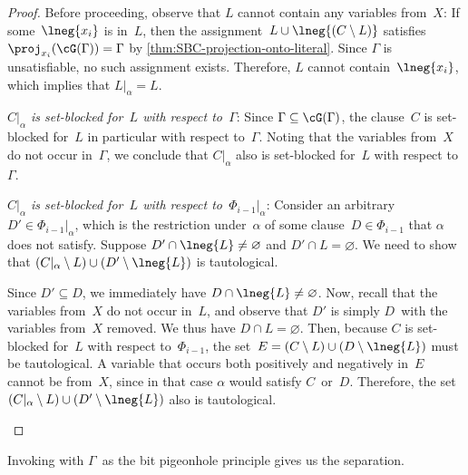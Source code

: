 \documentclass[12pt]{article}
\begin{document}
\begin{proof}
  Before proceeding, observe that $L$ cannot contain any variables from~$X$:
  If some~$\lneg{x_i}$ is in~$L$, then the assignment~$L \cup \lneg{(C \setminus L)}$
  satisfies~$\proj_{x_i}(\cG(\Gamma)) = \Gamma$
  by \cref{thm:SBC-projection-onto-literal}.
  Since $\Gamma$ is unsatisfiable, no such assignment exists.
  Therefore, $L$ cannot contain~$\lneg{x_i}$,
  which implies that $L|_\alpha = L$.

  \begin{description}
  \item\hspace{-\labelsep}\ignorespaces
    \textit{$C|_\alpha$ is set-blocked
      for~$L$ with respect to~$\Gamma$}:
    Since $\Gamma \subseteq \cG(\Gamma)$, the clause~$C$
    is set-blocked for~$L$ in particular with respect to~$\Gamma$.
    Noting that the variables from~$X$ do not occur in~$\Gamma$,
    we conclude that $C|_\alpha$ also is set-blocked
    for~$L$ with respect to~$\Gamma$.
  \item\hspace{-\labelsep}\ignorespaces
    \textit{$C|_\alpha$ is set-blocked
      for~$L$ with respect to~$\Phi_{i - 1}|_\alpha$}:
    Consider an arbitrary~$D' \in \Phi_{i - 1}|_\alpha$,
    which is the restriction under~$\alpha$
    of some clause~$D \in \Phi_{i - 1}$ that $\alpha$ does not satisfy.
    Suppose $D' \cap \lneg{L} \neq \varnothing$ and $D' \cap L = \varnothing$.
    We need to show that $(C|_\alpha \setminus L)
    \cup (D' \setminus \lneg{L})$ is tautological.

    Since $D' \subseteq D$, we immediately have $D \cap \lneg{L} \neq \varnothing$.
    Now, recall that the variables from~$X$ do not occur in~$L$,
    and observe that $D'$ is simply $D$~with the variables from~$X$ removed.
    We thus have $D \cap L = \varnothing$.
    Then, because $C$ is set-blocked for~$L$ with respect to~$\Phi_{i - 1}$,
    the set~$E = (C \setminus L) \cup (D \setminus \lneg{L})$ must be tautological.
    A variable that occurs both positively and negatively in~$E$
    cannot be from~$X$, since in that case $\alpha$ would satisfy $C$~or~$D$.
    Therefore, the set~$(C|_\alpha \setminus L)
    \cup (D' \setminus \lneg{L})$ also is tautological. \qedhere
  \end{description}
\end{proof}

Invoking 
with $\Gamma$~as the bit pigeonhole principle gives us the separation.
\end{document}
